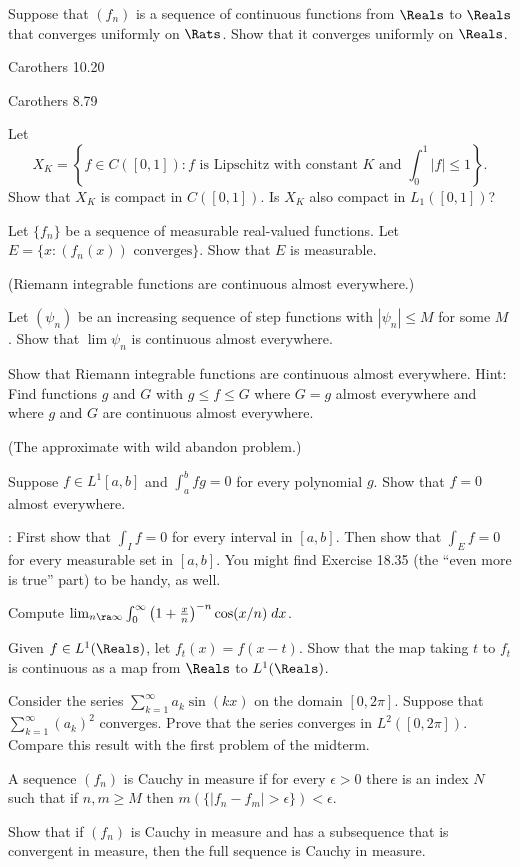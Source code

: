\documentclass[minion]{homework}
\begin{document}
\begin{aproblems}

\hproblem Suppose that $(f_n)$ is a sequence of continuous 
functions from $\Reals$ to $\Reals$ that converges uniformly
on $\Rats$.  Show that it converges uniformly on $\Reals$.

\hproblem Carothers 10.20 

\hproblem Carothers 8.79 

\hproblem Let
$$
X_K = \left\{f\in C([0,1]): \text{$f$ is Lipschitz with constant $K$ and $\int_0^1|f| \le 1$}\right\}.
$$
Show that $X_K$ is compact in $C([0,1])$.  Is $X_K$ also compact in $L_1([0,1])$?

\hproblem Let $\{f_n\}$ be a sequence of measurable real-valued functions.
Let $E=\{x: \text{$(f_n(x))$ converges}\}$.  Show that $E$ is measurable.


\hproblem (Riemann integrable functions are continuous almost everywhere.)
\begin{subproblems}
  \item Let $(\psi_n)$ be an increasing sequence of step functions with $|\psi_n|\le M$ for some $M$.  Show that $\lim \psi_n$ is continuous almost everywhere.
  \item Show that Riemann integrable functions are continuous almost everywhere.
  Hint:  Find functions $g$ and $G$ with $g\le f \le G$ where $G=g$ almost
  everywhere and where $g$ and $G$ are continuous almost everywhere.
\end{subproblems}

\hproblem (The approximate with wild abandon problem.)

Suppose $f\in L^1[a,b]$ and $\int_a^b fg=0$ for every
polynomial $g$.  Show that $f=0$ almost everywhere.

\Hint: First show that $\int_I f = 0$ for every interval in $[a,b]$.
Then show that $\int_E f=0$ for every measurable set in $[a,b]$. You might
find Exercise 18.35 (the ``even more is true'' part) to be handy, as well.

\hproblem Compute $\lim_{n\ra\infty} \int_0^\infty \left(1+\frac{x}{n}\right)^{-n}\cos(x/n)\;dx$.

\hproblem Given $f\in L^1(\Reals)$, let $f_t(x)=f(x-t)$.  Show that the
map taking $t$ to $f_t$ is continuous as a map from $\Reals$ to $L^1(\Reals)$.

\hproblem Consider the series $\sum_{k=1}^\infty a_k \sin(k x)$ on
the domain $[0,2\pi]$.  Suppose that $\sum_{k=1}^\infty (a_k)^2$ converges.
Prove that the series converges in $L^2([0,2\pi])$.
Compare this result with the first problem of the midterm.

\hproblem A sequence $(f_n)$ is Cauchy in measure if for every
$\epsilon>0$ there is an index $N$ such that if $n,m\ge M$ then
$m( \{|f_n-f_m|>\epsilon\} ) < \epsilon$.

Show that if $(f_n)$ is Cauchy in measure and has a subsequence
that is convergent in measure, then the full sequence is Cauchy in measure.

\end{aproblems}
\newpage
\end{document}

